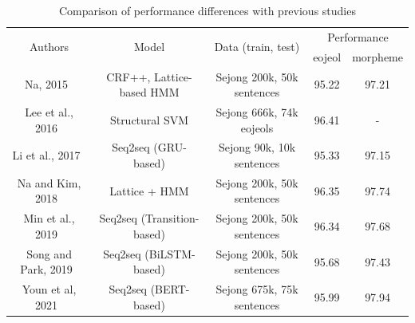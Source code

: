 \documentclass[AMS,STIX2COL]{WileyNJD-v2}
\begin{document}
    \begin{table}[]
        \caption{Comparison of performance differences with previous studies}\label{tab:differences-with-previous-studies}
        \begin{tabular*}{500pt}{@{\extracolsep\fill}ccc|cc@{\extracolsep\fill}}
            \toprule
            \multirow{2}{*}{Authors}              & \multirow{2}{*}{Model}                          & \multirow{2}{*}{Data (train, test)}         & \multicolumn{2}{c}{Performance}                           \\
            \cmidrule{4-5}
            ~                                     & ~                                               & ~                                           & \multicolumn{1}{c}{eojeol} & \multicolumn{1}{c}{morpheme} \\
            \midrule
            Na, 2015~\cite{NaSH2015}              & CRF++, Lattice-based HMM                        & Sejong 200k, 50k sentences                  & 95.22                      & 97.21                        \\
            Lee et al., 2016~\cite{LeeCH2016}     & Structural SVM                                  & Sejong 666k, 74k eojeols                    & 96.41                      & -                            \\
            Li et al., 2017~\cite{Li2017}         & Seq2seq (GRU-based)                             & Sejong 90k, 10k sentences                   & 95.33                      & 97.15                        \\
            Na and Kim, 2018~\cite{NaSH2018}      & Lattice + HMM                                   & Sejong 200k, 50k sentences                  & 96.35                      & 97.74                        \\
            Min et al., 2019~\cite{MinJW2019}     & Seq2seq (Transition-based)                      & Sejong 200k, 50k sentences                  & 96.34                      & 97.68                        \\
            Song and Park, 2019~\cite{SongHJ2019} & Seq2seq (BiLSTM-based)                          & Sejong 200k, 50k sentences                  & 95.68                      & 97.43                        \\
            Youn et al, 2021~\cite{YounJY2021}    & Seq2seq (BERT-based)                            & Sejong 675k, 75k sentences                  & 95.99                      & 97.94                        \\

\end{tabular*}
\end{table}
\end{document}
